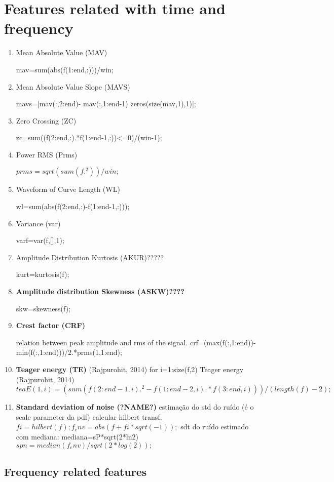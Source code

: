 \chapter{Features related with time and frequency}

\begin{enumerate}

\item Mean Absolute Value (MAV)

mav=sum(abs(f(1:end,:)))/win; %

\item Mean Absolute Value Slope (MAVS)

mavs=[mav(:,2:end)- mav(:,1:end-1) zeros(size(mav,1),1)];

\item Zero Crossing (ZC)

zc=sum((f(2:end,:).*f(1:end-1,:))<=0)/(win-1);

\item Power RMS (Prms) 

$prms=sqrt(sum(f.^2))/win;$

\item Waveform of Curve Length (WL) 

wl=sum(abs(f(2:end,:)-f(1:end-1,:)));

\item Variance (var)

varf=var(f,[],1);

\item Amplitude Distribution Kurtosis (AKUR)?????

kurt=kurtosis(f); %

\item \textbf{Amplitude distribution Skewness (ASKW)????}

skw=skewness(f);  %

\item \textbf{Crest factor (CRF)}

relation between peak amplitude and rms of the signal.
crf=(max(f(:,1:end))-min(f(:,1:end)))/2.*prms(1,1:end);

\item \textbf{Teager energy (TE)}
(Rajpurohit, 2014)
for i=1:size(f,2)
     Teager energy (Rajpurohit, 2014)
    $teaE(1,i)=(sum(f(2:end-1,i).^2-f(1:end-2,i).*f(3:end,i)))/(length(f)-2);$

\item \textbf{Standard deviation of noise (?NAME?)}%
estimação do std do ruído (é o scale parameter da pdf)
calcular hilbert transf.
$fi=hilbert(f);
f_env=abs(f+fi*sqrt(-1));$
sdt do ruído estimado com mediana: mediana=sP*sqrt(2*ln2)
$spn=median(f_env)/sqrt(2*log(2));$


\end{enumerate}

\section{Frequency related features}
